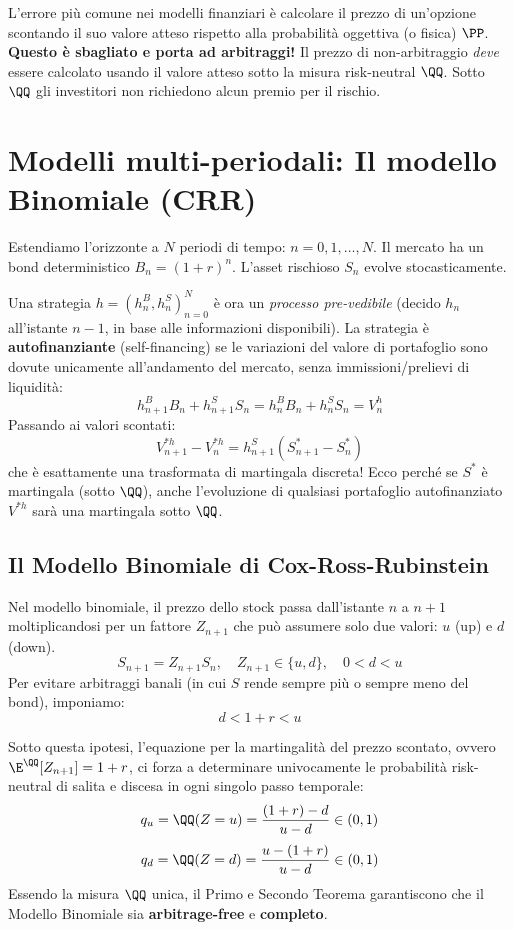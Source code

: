 \begin{tcolorbox}[colback=red!5!white,colframe=red!75!black,title=Attenzione: Pricing sotto $\PP$ vs $\QQ$]
L'errore più comune nei modelli finanziari è calcolare il prezzo di un'opzione scontando il suo valore atteso rispetto alla probabilità oggettiva (o fisica) $\PP$. \textbf{Questo è sbagliato e porta ad arbitraggi!} Il prezzo di non-arbitraggio \emph{deve} essere calcolato usando il valore atteso sotto la misura risk-neutral $\QQ$. Sotto $\QQ$ gli investitori non richiedono alcun premio per il rischio.
\end{tcolorbox}

\section{Modelli multi-periodali: Il modello Binomiale (CRR)}

Estendiamo l'orizzonte a $N$ periodi di tempo: $n=0, 1, \dots, N$. Il mercato ha un bond deterministico $B_n = (1+r)^n$. L'asset rischioso $S_n$ evolve stocasticamente.

Una strategia $h = (h_n^B, h_n^S)_{n=0}^{N}$ è ora un \emph{processo pre-vedibile} (decido $h_n$ all'istante $n-1$, in base alle informazioni disponibili). La strategia è \textbf{autofinanziante} (self-financing) se le variazioni del valore di portafoglio sono dovute unicamente all'andamento del mercato, senza immissioni/prelievi di liquidità:
\[ h_{n+1}^B B_n + h_{n+1}^S S_n = h_n^B B_n + h_n^S S_n = V_n^h \]
Passando ai valori scontati:
\[ V_{n+1}^{*h} - V_{n}^{*h} = h_{n+1}^S (S_{n+1}^* - S_n^*) \]
che è esattamente una trasformata di martingala discreta! Ecco perché se $S^*$ è martingala (sotto $\QQ$), anche l'evoluzione di qualsiasi portafoglio autofinanziato $V^{*h}$ sarà una martingala sotto $\QQ$.

\subsection{Il Modello Binomiale di Cox-Ross-Rubinstein}
Nel modello binomiale, il prezzo dello stock passa dall'istante $n$ a $n+1$ moltiplicandosi per un fattore $Z_{n+1}$ che può assumere solo due valori: $u$ (up) e $d$ (down).
\[ S_{n+1} = Z_{n+1} S_n, \quad Z_{n+1} \in \{u, d\}, \quad 0 < d < u \]
Per evitare arbitraggi banali (in cui $S$ rende sempre più o sempre meno del bond), imponiamo:
\[ d < 1+r < u \]

Sotto questa ipotesi, l'equazione per la martingalità del prezzo scontato, ovvero $\E^\QQ[Z_{n+1}] = 1+r$, ci forza a determinare univocamente le probabilità risk-neutral di salita e discesa in ogni singolo passo temporale:
\[ q_u = \QQ(Z = u) = \frac{(1+r) - d}{u - d} \in (0, 1) \]
\[ q_d = \QQ(Z = d) = \frac{u - (1+r)}{u - d} \in (0, 1) \]
Essendo la misura $\QQ$ unica, il Primo e Secondo Teorema garantiscono che il Modello Binomiale sia \textbf{arbitrage-free} e \textbf{completo}.

